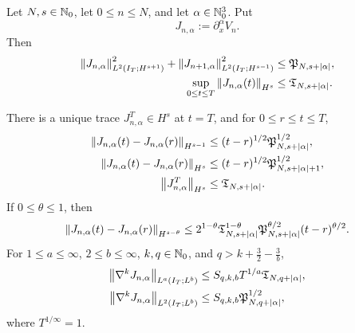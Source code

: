 \begin{theorem}
\label{u:thm:qc-mixed-jet}
\begin{samepage}
Let \(N,s\in\mathbb N_0\), let \(0\le n\le N\), and let
\(\alpha\in\mathbb N_0^3\).  Put
\[
 J_{n,\alpha}:=\partial_x^\alpha V_n.
\]
Then
\begin{align}
 \left\lVert J_{n,\alpha}\right\rVert_{L^2(I_T;H^{s+1})}^2
 +\left\lVert J_{n+1,\alpha}\right\rVert_{L^2(I_T;H^{s-1})}^2
 &\le \mathfrak P_{N,s+|\alpha|},
 \label{u:eq:qc-mixed-adjacent}\\
 \sup_{0\le t\le T}\left\lVert J_{n,\alpha}(t)\right\rVert_{H^s}
 &\le \mathfrak T_{N,s+|\alpha|}.
 \label{u:eq:qc-mixed-trace}
\end{align}
\end{samepage}
There is a unique trace \(J_{n,\alpha}^T\in H^s\) at \(t=T\), and
for \(0\le r\le t\le T\),
\begin{align}
 \left\lVert J_{n,\alpha}(t)-J_{n,\alpha}(r)\right\rVert_{H^{s-1}}
 &\le (t-r)^{1/2}\mathfrak P_{N,s+|\alpha|}^{1/2},
 \label{u:eq:qc-mixed-low-modulus}\\
 \left\lVert J_{n,\alpha}(t)-J_{n,\alpha}(r)\right\rVert_{H^s}
 &\le (t-r)^{1/2}
        \mathfrak P_{N,s+|\alpha|+1}^{1/2},
 \label{u:eq:qc-mixed-strong-modulus}\\
 \left\lVert J_{n,\alpha}^T\right\rVert_{H^s}
 &\le \mathfrak T_{N,s+|\alpha|}.
 \label{u:eq:qc-mixed-endpoint-size}
\end{align}
If \(0\le\theta\le1\), then
\begin{equation}
 \left\lVert J_{n,\alpha}(t)-J_{n,\alpha}(r)\right\rVert_{H^{s-\theta}}
 \le
 2^{1-\theta}
 \mathfrak T_{N,s+|\alpha|}^{1-\theta}
 \mathfrak P_{N,s+|\alpha|}^{\theta/2}
 (t-r)^{\theta/2}.
 \label{u:eq:qc-mixed-interpolated-modulus}
\end{equation}
For \(1\le a\le\infty\), \(2\le b\le\infty\),
\(k,q\in\mathbb N_0\), and
\(q>k+\frac32-\frac3b\),
\begin{align}
 \left\lVert \nabla^kJ_{n,\alpha}\right\rVert_{L^a(I_T;L^b)}
 &\le S_{q,k,b}T^{1/a}\mathfrak T_{N,q+|\alpha|},
 \label{u:eq:qc-mixed-la-lb}\\
 \left\lVert \nabla^kJ_{n,\alpha}\right\rVert_{L^2(I_T;L^b)}
 &\le S_{q,k,b}\mathfrak P_{N,q+|\alpha|}^{1/2},
 \label{u:eq:qc-mixed-l2-lb}
\end{align}
where \(T^{1/\infty}=1\).
\end{theorem}

